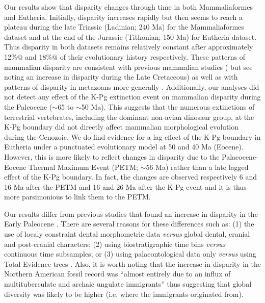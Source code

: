 \documentclass[12pt,letterpaper]{article}
\begin{document}
Our results show that disparity changes through time in both Mammaliaformes and Eutheria.
Initially, disparity increases rapidly but then seems to reach a plateau during the late Triassic (Ladinian; 240 Ma) for the Mammaliaformes dataset and at the end of the Jurassic (Tithonian; 150 Ma) for Eutheria dataset.
Thus disparity in both datasets remains relatively constant after approximately 12\%@ and 18\%@ of their evolutionary history respectively.
These patterns of mammalian disparity are consistent with previous mammalian studies (\citealt{Close2015} but see \citealt{Grossnickle2013} noting an increase in disparity during the Late Cretaceous) as well as with patterns of disparity in metazoans more generally \citep{Hughes20082013}. %
Additionally, our analyses did not detect any effect of the K-Pg extinction event on mammalian disparity during the Paleocene ($\sim$65 to $\sim$50 Ma). %
This suggests that the numerous extinctions of terrestrial vertebrates, including the dominant non-avian dinosaur group, at the K-Pg boundary did not directly affect mammalian morphological evolution during the Cenozoic.
We do find evidence for a lag effect of the K-Pg boundary in Eutheria under a punctuated evolutionary model at 50 and 40 Ma (Eocene).
However, this is more likely to reflect changes in disparity due to the Palaeocene-Eocene Thermal Maximum Event (PETM; $\sim$56 Ma) rather than a late lagged effect of the K-Pg boundary.
In fact, the changes are observed respectively 6 and 16 Ma after the PETM and 16 and 26 Ma after the K-Pg event and it is thus more parsimonious to link them to the PETM.

Our results differ from previous studies that found an increase in disparity in the Early Paleocene \citep{Wilson2013}. %
There are several reasons for these differences such as: (1) the use of localy constraint dental morphometric data \textit{versus} global dental, cranial and post-cranial characters; (2) using biostratigraphic time bins \textit{versus} continuous time subsamples; or (3) using palaeontological data only \textit{versus} using Total Evidence trees \citep[][\textit{versus} this study]{Wilson2013}.
Also, it is worth noting that the increase in disparity in the Northern American fossil record was ``almost entirely due to an influx of multituberculate and archaic ungulate immigrants'' \citep{Wilson2013} thus suggesting that global diversity was likely to be higher (i.e. where the immigrants originated from).
\end{document}
